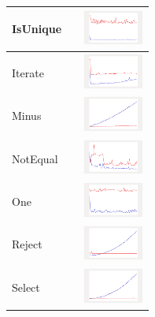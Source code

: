 \begin{longtable}{ m{2.5cm} m{8cm} m{2cm} }
IsUnique &

&
\includegraphics[width=2cm]{graphs/set/small/isUnique}
\\\hline

Iterate &

&
\includegraphics[width=2cm]{graphs/set/small/Iterate}
\\\hline

Minus &

&
\includegraphics[width=2cm]{graphs/set/small/Minus}
\\\hline

NotEqual &

&
\includegraphics[width=2cm]{graphs/set/small/NEQ}
\\\hline

One &

&
\includegraphics[width=2cm]{graphs/set/small/One}
\\\hline

Reject &

&
\includegraphics[width=2cm]{graphs/set/small/Reject}
\\\hline

Select &

&
\includegraphics[width=2cm]{graphs/set/small/Select}
\\\hline


\end{longtable}
